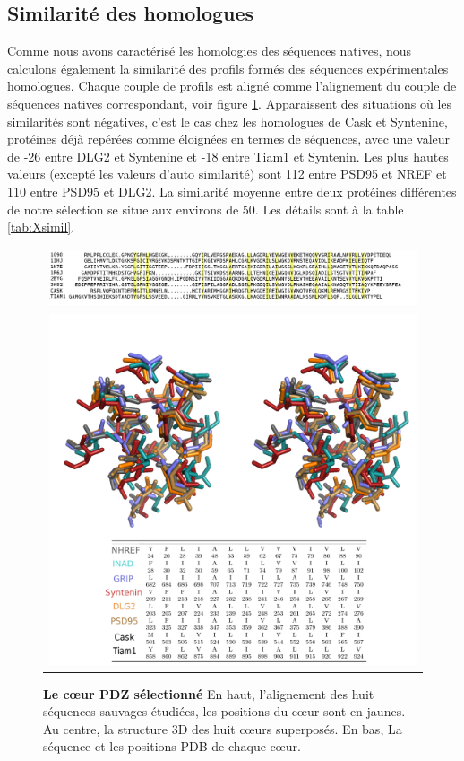     \subsection{Similarité des homologues}

Comme nous avons caractérisé les homologies des séquences natives, nous calculons également la similarité des profils formés des séquences expérimentales homologues. Chaque couple de profils est aligné comme l'alignement du couple de séquences natives correspondant, voir figure \ref{fig:corePDZ}. Apparaissent des situations où les similarités sont négatives, c'est le cas chez les homologues de Cask et Syntenine, protéines déjà repérées comme éloignées en termes de séquences, avec une valeur de -26 entre DLG2 et Syntenine et -18 entre Tiam1  et Syntenin. Les plus hautes valeurs (excepté les valeurs d'auto similarité) sont  112 entre PSD95 et NREF et 110 entre PSD95 et DLG2. La similarité moyenne entre deux protéines différentes de notre sélection se situe aux environs de 50. Les détails sont à la table \ref{tab:Xsimil}. 
    
    \begin{figure}[!htbp]
     \centering
     \begin{tabular}{c}
       \includegraphics[width=18cm]{images/natives_alignees.png} \\
       \includegraphics[width=16cm]{images/corePDZ2.png} \\
     \end{tabular}
     \caption{\textbf{Le cœur PDZ sélectionné} En haut, l'alignement des huit séquences sauvages étudiées, les positions du cœur sont en jaunes. Au centre, la structure 3D des huit cœurs superposés. En bas, La séquence et les \og positions PDB \fg de chaque cœur.}
     \label{fig:corePDZ}      
    \end{figure}
    
